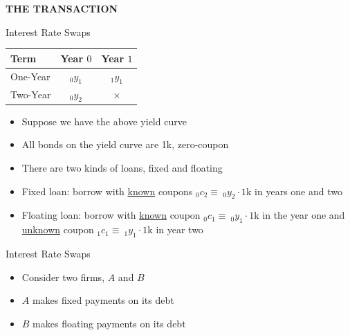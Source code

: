 \documentclass{beamer}
\begin{document}
\begin{frame}
    \begin{center}
        \textbf{THE TRANSACTION}
    \end{center}
\end{frame}

\begin{frame}{Interest Rate Swaps}
    \begin{center}
        \begin{tabular}{lcc}
            Term & Year $0$ & Year $1$ \\ \hline
            One-Year & $_{0}y_{1}$ & $_{1}y_{1}$ \\
            Two-Year & $_{0}y_{2}$ & $\times$
        \end{tabular}
    \end{center}
    \begin{itemize}
        \item Suppose we have the above yield curve
        \item All bonds on the yield curve are 1k, zero-coupon
        \item There are two kinds of loans, fixed and floating
        \item Fixed loan: borrow with \underline{known} coupons $_{0}c_{2}\equiv\:_{0}y_{2}\cdot 1$k in years one and two 
        \item Floating loan: borrow with \underline{known} coupon $_{0}c_{1}\equiv\:_{0}y_{1}\cdot 1$k in the year one and \underline{unknown} coupon $_{1}c_{1}\equiv\:_{1}y_{1}\cdot 1$k in year two
    \end{itemize}
\end{frame}

\begin{frame}{Interest Rate Swaps}
    \begin{itemize}
        \item Consider two firms, $A$ and $B$
        \item $A$ makes fixed payments on its debt
        \item $B$ makes floating payments on its debt
    \end{itemize}
\begin{center}
\end{center}
\end{frame}
\end{document}
